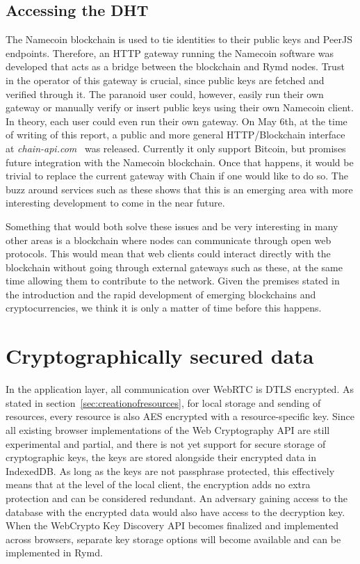 \subsection{Accessing the DHT}
The Namecoin blockchain is used to tie identities to their public keys and PeerJS endpoints. Therefore, an HTTP gateway running the Namecoin software was developed that acts as a bridge between the blockchain and Rymd nodes. Trust in the operator of this gateway is crucial, since public keys are fetched and verified through it. The paranoid user could, however, easily run their own gateway or manually verify or insert public keys using their own Namecoin client. In theory, each user could even run their own gateway. On May 6th, at the time of writing of this report, a public and more general HTTP/Blockchain interface at \emph{chain-api.com}~\cite{Chain:2014:Online} was released. Currently it only support Bitcoin, but promises future integration with the Namecoin blockchain. Once that happens, it would be trivial to replace the current gateway with Chain if one would like to do so. The buzz around services such as these shows that this is an emerging area with more interesting development to come in the near future.

Something that would both solve these issues and be very interesting in many other areas is a blockchain where nodes can communicate through open web protocols. This would mean that web clients could interact directly with the blockchain without going through external gateways such as these, at the same time allowing them to contribute to the network. Given the premises stated in the introduction and the rapid development of emerging blockchains and cryptocurrencies, we think it is only a matter of time before this happens.

\section{Cryptographically secured data}
In the application layer, all communication over WebRTC is DTLS encrypted. As stated in section~\ref{sec:creationofresources}, for local storage and sending of resources, every resource is also AES encrypted with a resource-specific key. Since all existing browser implementations of the Web Cryptography API are still experimental and partial, and there is not yet support for secure storage of cryptographic keys, the keys are stored alongside their encrypted data in IndexedDB. As long as the keys are not passphrase protected, this effectively means that at the level of the local client, the encryption adds no extra protection and can be considered redundant. An adversary gaining access to the database with the encrypted data would also have access to the decryption key. When the WebCrypto Key Discovery API becomes finalized and implemented across browsers, separate key storage options will become available and can be implemented in Rymd.

